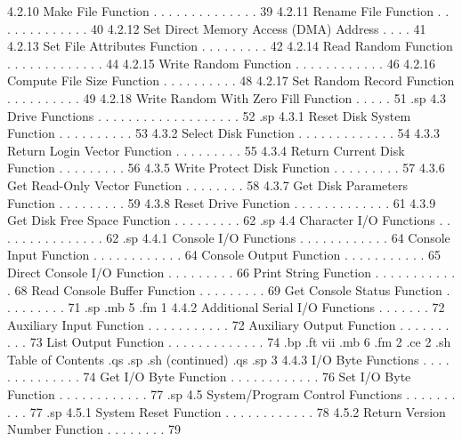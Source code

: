         4.2.10 Make File Function . . . . . . . . . . . . . .  39 
        4.2.11 Rename File Function . . . . . . . . . . . . .  40 
        4.2.12 Set Direct Memory Access (DMA) Address . . . .  41 
        4.2.13 Set File Attributes Function . . . . . . . . .  42 
        4.2.14 Read Random Function . . . . . . . . . . . . .  44 
        4.2.15 Write Random Function  . . . . . . . . . . . .  46 
        4.2.16 Compute File Size Function . . . . . . . . . .  48 
        4.2.17 Set Random Record Function . . . . . . . . . .  49 
        4.2.18 Write Random With Zero Fill Function . . . . .  51 
.sp
   4.3  Drive Functions . . . . . . . . . . . . . . . . . . .  52 
.sp
        4.3.1  Reset Disk System Function . . . . . . . . . .  53 
        4.3.2  Select Disk Function . . . . . . . . . . . . .  54 
        4.3.3  Return Login Vector Function . . . . . . . . .  55 
        4.3.4  Return Current Disk Function . . . . . . . . .  56 
        4.3.5  Write Protect Disk Function  . . . . . . . . .  57 
        4.3.6  Get Read-Only Vector Function  . . . . . . . .  58 
        4.3.7  Get Disk Parameters Function . . . . . . . . .  59 
        4.3.8  Reset Drive Function . . . . . . . . . . . . .  61 
        4.3.9  Get Disk Free Space Function . . . . . . . . .  62 
.sp
   4.4  Character I/O Functions . . . . . . . . . . . . . . .  62 
.sp
        4.4.1  Console I/O Functions  . . . . . . . . . . . .  64 
               Console Input Function . . . . . . . . . . . .  64 
               Console Output Function  . . . . . . . . . . .  65 
               Direct Console I/O Function  . . . . . . . . .  66 
               Print String Function  . . . . . . . . . . . .  68 
               Read Console Buffer Function . . . . . . . . .  69 
               Get Console Status Function  . . . . . . . . .  71 
.sp
.mb 5
.fm 1
        4.4.2  Additional Serial I/O Functions  . . . . . . .  72 
               Auxiliary Input Function . . . . . . . . . . .  72 
               Auxiliary Output Function  . . . . . . . . . .  73 
               List Output Function . . . . . . . . . . . . .  74 
.bp
.ft                                 vii
.mb 6
.fm 2
.ce 2
.sh
Table of Contents 
.qs
.sp
.sh
(continued)
.qs
.sp 3
        4.4.3  I/O Byte Functions . . . . . . . . . . . . . .  74 
               Get I/O Byte Function  . . . . . . . . . . . .  76 
               Set I/O Byte Function  . . . . . . . . . . . .  77 
.sp
   4.5  System/Program Control Functions  . . . . . . . . . .  77 
.sp
        4.5.1  System Reset Function  . . . . . . . . . . . .  78 
        4.5.2  Return Version Number Function . . . . . . . .  79 
